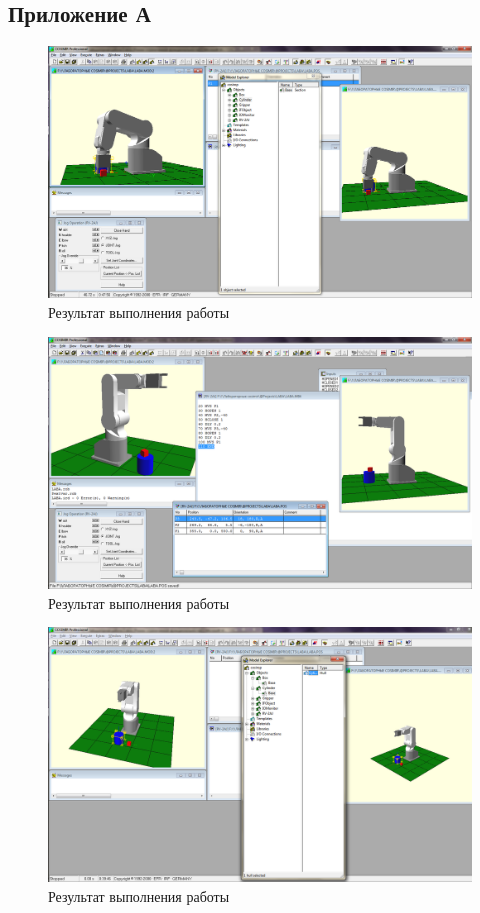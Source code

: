 \clearpage

\subsection*{Приложение А}

\begin{figure}[ht]
\centering
	\includegraphics[scale=0.35]{1.png}
	\caption{Результат выполнения работы}
\end{figure}

\begin{figure}[ht]
\centering
	\includegraphics[scale=0.35]{2.png}
	\caption{Результат выполнения работы}
\end{figure}

\begin{figure}[ht]
\centering
	\includegraphics[scale=0.4]{3.png}
	\caption{Результат выполнения работы}
\end{figure}

